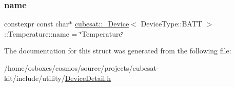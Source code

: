 \subsubsection{\texorpdfstring{name}{name}}
{\footnotesize\ttfamily constexpr const char$\ast$ \hyperlink{structcubesat_1_1__Device}{cubesat\+::\+\_\+\+Device}$<$ Device\+Type\+::\+B\+A\+TT $>$\+::Temperature\+::name = \char`\"{}Temperature\char`\"{}\hspace{0.3cm}{\ttfamily [static]}}



The documentation for this struct was generated from the following file\+:\begin{DoxyCompactItemize}
\item 
/home/osboxes/cosmos/source/projects/cubesat-\/kit/include/utility/\hyperlink{DeviceDetail_8h}{Device\+Detail.\+h}\end{DoxyCompactItemize}
